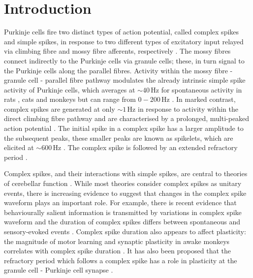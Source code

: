 \documentclass[utf8]{frontiersSCNS} %
\newcommand{\hz}{\,\mathrm{Hz}}
\begin{document}
\section{Introduction}

Purkinje cells fire two distinct types of action potential, called
complex spikes and simple spikes, in response to two different types
of excitatory input relayed via climbing fibre and mossy fibre
afferents, respectively \cite{PalayChanPalay1974, ito1984cerebellum, eccles2013cerebellum}. The mossy fibres connect indirectly to the
Purkinje cells via granule cells; these, in turn signal to the
Purkinje cells along the parallel fibres. Activity within the mossy
fibre - granule cell - parallel fibre pathway modulates the already intrinsic
simple spike activity of Purkinje cells, which averages at $\sim
40\hz$ for spontaneous activity in rats \cite{ArmstrongRawson1979}, cats \cite{thach1967somatosensory} and monkeys \cite{fu1997relationship} but can range from $0-200\hz$ \cite{chen2016cerebellum}. In marked contrast, complex spikes are generated at only $\sim 1\hz$ \cite{lang1999patterns} in response to activity
within the direct climbing fibre pathway and are characterised by a prolonged, multi-peaked action potential \cite{CampbellHesslow1986}. The initial spike in a complex spike has a larger amplitude to the subsequent peaks, these smaller peaks are known as spikelets, which are elicited
at $\sim 600\hz$ \cite{WarnaarEtAl2015,BurroughsEtAl2016}. The complex spike is followed by an extended refractory period \cite{VoogdGlickstein1998,EcclesLlinasSasaki1966,Fujita1968}.


%

Complex spikes, and their interactions with simple spikes, are central to theories of cerebellar function \cite{CampbellHesslow1986, eccles2013cerebellum, ito1984cerebellum, ito2011cerebellum, YangLispberger2014}.  While most theories consider complex spikes as unitary events, there is increasing evidence to suggest that changes in the complex spike waveform plays an important role. For example, there is recent evidence that behaviourally salient information is transmitted by variations in
complex spike waveform and the duration of complex spikes differs
between spontaneous and sensory-evoked events
\cite{MarutaEtAl2007,NajafiMedina2013}. Complex spike duration also
appears to affect plasticity: the magnitude of motor learning and synaptic plasticity in awake
monkeys correlates with complex spike duration \cite{YangLispberger2014}. It has also been proposed that the refractory period which follows a complex spike has a role in plasticity at the granule cell - Purkinje cell synapse \cite{Houghton2014}.
\end{document}
